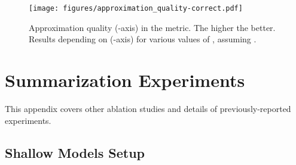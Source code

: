 \documentclass{article}
\begin{document}
\begin{figure}
    \centering
    \texttt{[image: figures/approximation\_quality-correct.pdf]}
    \caption{Approximation quality (-axis) in the  metric. The higher the better. Results depending on  (-axis) for various values of , assuming .}
    \label{fig:performance2}
\end{figure}


\section{Summarization Experiments}\label{appendix_experiment_details}

This appendix covers other ablation studies and details of previously-reported experiments.

\subsection{Shallow Models Setup}
\end{document}
